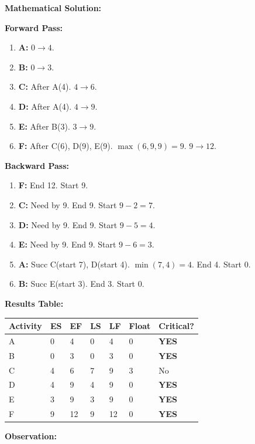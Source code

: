 \documentclass[
  letterpaper,
  DIV=11,
  numbers=noendperiod]{scrreprt}
\providecommand{\tightlist}{%
  \setlength{\itemsep}{0pt}\setlength{\parskip}{0pt}}
\begin{document}
\textbf{Mathematical Solution:}

\textbf{Forward Pass:}

\begin{enumerate}
\def\labelenumi{\arabic{enumi}.}
\tightlist
\item
  \textbf{A:} \(0 \to 4\).
\item
  \textbf{B:} \(0 \to 3\).
\item
  \textbf{C:} After A(4). \(4 \to 6\).
\item
  \textbf{D:} After A(4). \(4 \to 9\).
\item
  \textbf{E:} After B(3). \(3 \to 9\).
\item
  \textbf{F:} After C(6), D(9), E(9). \(\max(6, 9, 9) = 9\).
  \(9 \to 12\).
\end{enumerate}

\textbf{Backward Pass:}

\begin{enumerate}
\def\labelenumi{\arabic{enumi}.}
\tightlist
\item
  \textbf{F:} End 12. Start 9.
\item
  \textbf{C:} Need by 9. End 9. Start \(9-2=7\).
\item
  \textbf{D:} Need by 9. End 9. Start \(9-5=4\).
\item
  \textbf{E:} Need by 9. End 9. Start \(9-6=3\).
\item
  \textbf{A:} Succ C(start 7), D(start 4). \(\min(7, 4) = 4\). End 4.
  Start 0.
\item
  \textbf{B:} Succ E(start 3). End 3. Start 0.
\end{enumerate}

\textbf{Results Table:}

\begin{longtable}[]{@{}lllllll@{}}
\toprule\noalign{}
Activity & ES & EF & LS & LF & Float & Critical? \\
\midrule\noalign{}
\endhead
\bottomrule\noalign{}
\endlastfoot
A & 0 & 4 & 0 & 4 & 0 & \textbf{YES} \\
B & 0 & 3 & 0 & 3 & 0 & \textbf{YES} \\
C & 4 & 6 & 7 & 9 & 3 & No \\
D & 4 & 9 & 4 & 9 & 0 & \textbf{YES} \\
E & 3 & 9 & 3 & 9 & 0 & \textbf{YES} \\
F & 9 & 12 & 9 & 12 & 0 & \textbf{YES} \\
\end{longtable}

\textbf{Observation:}
\end{document}

